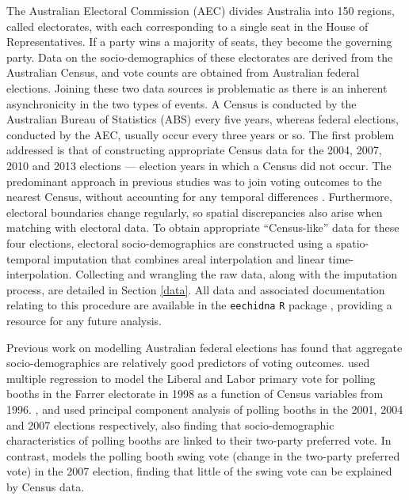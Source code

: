 \documentclass[times, doublespace]{anzsauth}
\begin{document}
The Australian Electoral Commission (AEC) divides Australia into 150 regions, called electorates, with each corresponding to a single seat in the House of Representatives. If a party wins a majority of seats, they become the governing party. Data on the socio-demographics of these electorates are derived from the Australian Census, and vote counts are obtained from Australian federal elections. Joining these two data sources is problematic as there is an inherent asynchronicity in the two types of events. A Census is conducted by the Australian Bureau of Statistics (ABS) every five years, whereas federal elections, conducted by the AEC, usually occur every three years or so. The first problem addressed is that of constructing appropriate Census data for the 2004, 2007, 2010 and 2013 elections --- election years in which a Census did not occur. The predominant approach in previous studies was to join voting outcomes to the nearest Census, without accounting for any temporal differences \citep[see][]{DavisStimson98, Stimson06, Liao09, Stimson09}. Furthermore, electoral boundaries change regularly, so spatial discrepancies also arise when matching with electoral data. To obtain appropriate ``Census-like'' data for these four elections, electoral socio-demographics are constructed using a spatio-temporal imputation that combines areal interpolation \citep{Goodchild1993} and linear time-interpolation. Collecting and wrangling the raw data, along with the imputation process, are detailed in Section \ref{data}. All data and associated documentation relating to this procedure are available in the \texttt{eechidna} \texttt{R} package \citep{eechidna}, providing a resource for any future analysis.

Previous work on modelling Australian federal elections has found that aggregate socio-demographics are relatively good predictors of voting outcomes. \citet{Forrest01} used multiple regression to model the Liberal and Labor primary vote for polling booths in the Farrer electorate in 1998 as a function of Census variables from 1996. \citet{Stimson06}, \citet{Stimson09} and \citet{Stimson12} used principal component analysis of polling booths in the 2001, 2004 and 2007 elections respectively, also finding that socio-demographic characteristics of polling booths are linked to their two-party preferred vote. In contrast, \citet{Stimson09} models the polling booth swing vote (change in the two-party preferred vote) in the 2007 election, finding that little of the swing vote can be explained by Census data.
\end{document}
